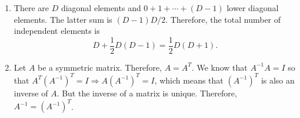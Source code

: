 \begin{enumerate}
\item There are $D$ diagonal elements and $0 + 1 + \cdots + (D - 1)$ lower diagonal elements. The
latter sum is $(D - 1)D/2$. Therefore, the total number of independent elements is
\[
D + \frac{1}{2}D(D - 1) = \frac{1}{2}D(D + 1).
\]

\item Let $A$ be a symmetric matrix. Therefore, $A = A^T$. We know that $A^{-1}A = I$ so that
$A^T(A^{-1})^T = I \Rightarrow A (A^{-1})^T = I$, which means that $(A^{-1})^T$ is also an inverse
of $A$. But the inverse of a matrix is unique. Therefore, $A^{-1} = (A^{-1})^T$.
\end{enumerate}


